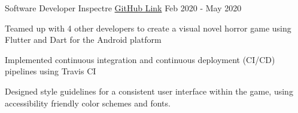 \begin{cventries}

  \cventry
    {Software Developer} %
    {Inspectre} %
    {\href{https://github.com/cse442-spring-2020-offering/cse442-semester-project-bugs-are-features}{GitHub Link}} %
    {Feb 2020 - May 2020} %
    {
      \begin{cvitems} %
        \item Teamed up with 4 other developers to create a visual novel horror game using Flutter and Dart for the Android platform
        \item Implemented continuous integration and continuous deployment (CI/CD) pipelines using Travis CI
        \item Designed style guidelines for a consistent user interface within the game, using accessibility friendly color schemes and fonts.
      \end{cvitems}
    }

\end{cventries}
